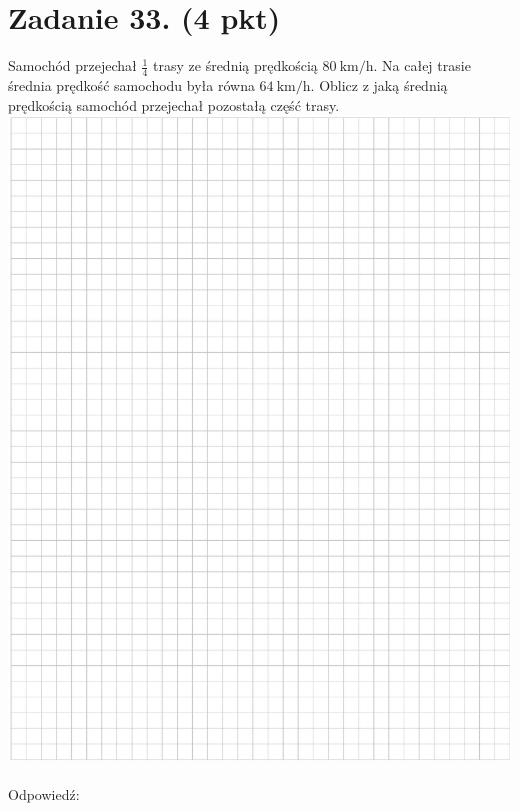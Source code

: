 \documentclass[10pt]{article}
\begin{document}
\section*{Zadanie 33. (4 pkt)}
Samochód przejechał \(\frac{1}{4}\) trasy ze średnią prędkością \(80 \mathrm{~km} / \mathrm{h}\). Na całej trasie średnia prędkość samochodu była równa \(64 \mathrm{~km} / \mathrm{h}\). Oblicz z jaką średnią prędkością samochód przejechał pozostałą część trasy.\\
\includegraphics[max width=\textwidth, center]{2024_11_21_b31e6de468170710de69g-16}\\
\(\qquad\)\\
Odpowiedź:
\end{document}
